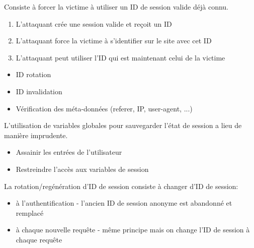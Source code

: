 \documentclass[a4paper]{article}
\begin{document}
\begin{attaque}
    Consiste à forcer la victime à utiliser un ID de session valide déjà connu.
    \begin{enumerate}
        \item L’attaquant crée une session valide et reçoit un ID
        \item L’attaquant force la victime à s’identifier sur le site avec cet ID
        \item L’attaquant peut utiliser l’ID qui est maintenant celui de la victime
    \end{enumerate}
    \begin{itemize}
        \item ID rotation
        \item ID invalidation
        \item Vérification des méta-données (referer, IP, user-agent, ...)
    \end{itemize}
\end{attaque}

\begin{mauvaisepratique}
    L’utilisation de variables globales pour sauvegarder l’état de session a lieu de manière imprudente.
    \begin{itemize}
        \item Assainir les entrées de l’utilisateur
        \item Restreindre l’accès aux variables de session
    \end{itemize}
\end{mauvaisepratique}

\begin{bonnepratique}
    La rotation/regénération d’ID de session consiste à changer d’ID de session:
    \begin{itemize}
        \item à l’authentification - l'ancien ID de session anonyme est abandonné et remplacé
        \item à chaque nouvelle requête - même principe mais on change l’ID de session à chaque requête
    \end{itemize}
\end{bonnepratique}
\end{document}
